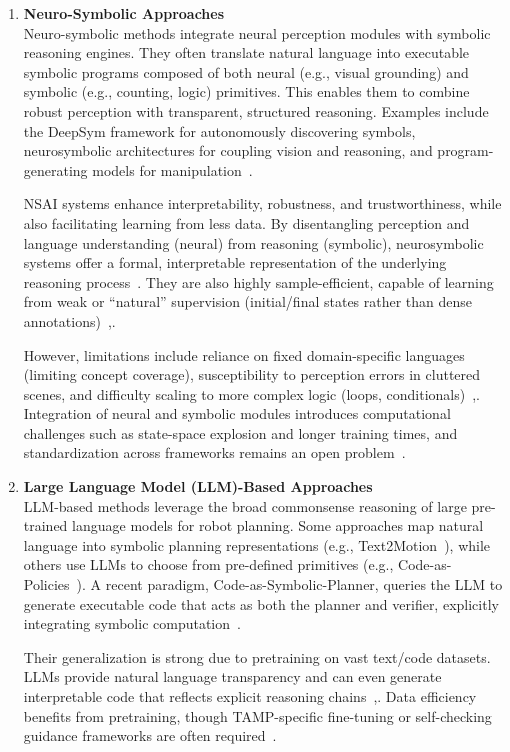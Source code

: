 \documentclass[12pt]{extarticle}
\begin{document}
\begin{enumerate}[label=\Roman*.]
    \item \textbf{Neuro-Symbolic Approaches} \\
Neuro-symbolic methods integrate neural perception modules with symbolic reasoning engines. They often translate natural language into executable symbolic programs composed of both neural (e.g., visual grounding) and symbolic (e.g., counting, logic) primitives. This enables them to combine robust perception with transparent, structured reasoning. Examples include the DeepSym framework for autonomously discovering symbols, neurosymbolic architectures for coupling vision and reasoning, and program-generating models for manipulation~\cite{nsai}.

NSAI systems enhance interpretability, robustness, and trustworthiness, while also facilitating learning from less data. By disentangling perception and language understanding (neural) from reasoning (symbolic), neurosymbolic systems offer a formal, interpretable representation of the underlying reasoning process~\cite{enhancing-interpret}. They are also highly sample-efficient, capable of learning from weak or “natural” supervision (initial/final states rather than dense annotations)~\cite{nsai},\cite{learning-neuro-symbolic}.

However, limitations include reliance on fixed domain-specific languages (limiting concept coverage), susceptibility to perception errors in cluttered scenes, and difficulty scaling to more complex logic (loops, conditionals)~\cite{enhancing-interpret},\cite{learning-neuro-symbolic}. Integration of neural and symbolic modules introduces computational challenges such as state-space explosion and longer training times, and standardization across frameworks remains an open problem~\cite{nsai}.

    \item \textbf{Large Language Model (LLM)-Based Approaches} \\
LLM-based methods leverage the broad commonsense reasoning of large pre-trained language models for robot planning. Some approaches map natural language into symbolic planning representations (e.g., Text2Motion~\cite{text-2-motion}), while others use LLMs to choose from pre-defined primitives (e.g., Code-as-Policies~\cite{code-as-policies}). A recent paradigm, Code-as-Symbolic-Planner, queries the LLM to generate executable code that acts as both the planner and verifier, explicitly integrating symbolic computation~\cite{code-as-symbolic-planner}.

Their generalization is strong due to pretraining on vast text/code datasets. LLMs provide natural language transparency and can even generate interpretable code that reflects explicit reasoning chains~\cite{code-as-symbolic-planner},\cite{code-as-policies}. Data efficiency benefits from pretraining, though TAMP-specific fine-tuning or self-checking guidance frameworks are often required~\cite{plangenllm}.


\end{enumerate}
\end{document}
